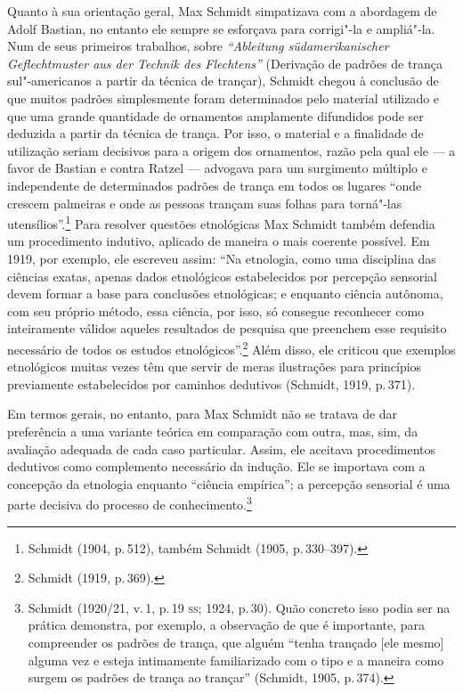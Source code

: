 Quanto à sua orientação geral, Max Schmidt simpatizava com a abordagem
de Adolf Bastian, no entanto ele sempre se esforçava para corrigi"-la e
ampliá"-la. Num de seus primeiros trabalhos, sobre \textit{``Ableitung
südamerikanischer Geflechtmuster aus der Technik des Flechtens''}
(Derivação de padrões de trança sul"-americanos a partir da técnica de
trançar), Schmidt chegou à conclusão de que muitos padrões simplesmente
foram determinados pelo material utilizado e que uma grande quantidade
de ornamentos amplamente difundidos pode ser deduzida a partir da
técnica de trança. Por isso, o material e a finalidade de utilização
seriam decisivos para a origem dos ornamentos, razão pela qual ele --- a
favor de Bastian e contra Ratzel --- advogava para um surgimento múltiplo
e independente de determinados padrões de trança em todos os lugares
``onde crescem palmeiras e onde as pessoas trançam suas folhas para
torná"-las utensílios''.\footnote{Schmidt (1904, p.\,512), também Schmidt
  (1905, p.\,330--397).} Para resolver questões etnológicas Max Schmidt
também defendia um procedimento indutivo, aplicado de maneira o mais
coerente possível. Em 1919, por exemplo, ele escreveu assim: ``Na
etnologia, como uma disciplina das ciências exatas, apenas dados
etnológicos estabelecidos por percepção sensorial devem formar a base
para conclusões etnológicas; e enquanto ciência autônoma, com seu
próprio método, essa ciência, por isso, só consegue reconhecer como
inteiramente válidos aqueles resultados de pesquisa que preenchem esse
requisito necessário de todos os estudos etnológicos''.\footnote{Schmidt
  (1919, p.\,369).} Além disso, ele criticou que exemplos etnológicos
muitas vezes têm que servir de meras ilustrações para princípios
previamente estabelecidos por caminhos dedutivos (Schmidt, 1919, p.\,371).

Em termos gerais, no entanto, para Max Schmidt não se tratava de dar
preferência a uma variante teórica em comparação com outra, mas, sim,
da avaliação adequada de cada caso particular. Assim, ele aceitava
procedimentos dedutivos como complemento necessário da indução. Ele se
importava com a concepção da etnologia enquanto ``ciência empírica''; a
percepção sensorial é uma parte decisiva do processo de
conhecimento.\footnote{Schmidt (1920/21, v.\,1, p.\,19 \textsc{ss}; 1924, p.\,30).
  Quão concreto isso podia ser na prática demonstra, por exemplo, a
  observação de que é importante, para compreender os padrões de trança,
  que alguém ``tenha trançado {[}ele mesmo{]} alguma vez e esteja
  intimamente familiarizado com o tipo e a maneira como surgem os
  padrões de trança ao trançar'' (Schmidt, 1905, p.\,374).}

